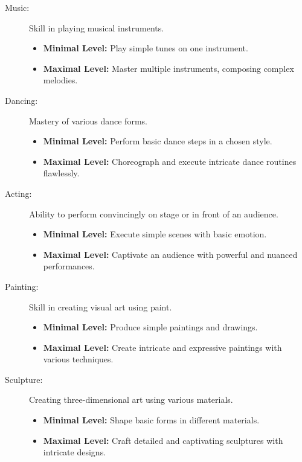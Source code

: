 \documentclass[12pt]{book}
\begin{document}
\begin{description}

    \item[Music:] Skill in playing musical instruments.
        \begin{itemize}
            \item \textbf{Minimal Level:} Play simple tunes on one instrument.
            \item \textbf{Maximal Level:} Master multiple instruments, composing complex melodies.
        \end{itemize}

    \item[Dancing:] Mastery of various dance forms.
        \begin{itemize}
            \item \textbf{Minimal Level:} Perform basic dance steps in a chosen style.
            \item \textbf{Maximal Level:} Choreograph and execute intricate dance routines flawlessly.
        \end{itemize}

    \item[Acting:] Ability to perform convincingly on stage or in front of an audience.
        \begin{itemize}
            \item \textbf{Minimal Level:} Execute simple scenes with basic emotion.
            \item \textbf{Maximal Level:} Captivate an audience with powerful and nuanced performances.
        \end{itemize}

    \item[Painting:] Skill in creating visual art using paint.
        \begin{itemize}
            \item \textbf{Minimal Level:} Produce simple paintings and drawings.
            \item \textbf{Maximal Level:} Create intricate and expressive paintings with various techniques.
        \end{itemize}

    \item[Sculpture:] Creating three-dimensional art using various materials.
        \begin{itemize}
            \item \textbf{Minimal Level:} Shape basic forms in different materials.
            \item \textbf{Maximal Level:} Craft detailed and captivating sculptures with intricate designs.
        \end{itemize}


\end{description}
\end{document}
